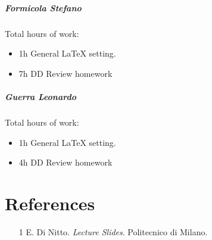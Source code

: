 \documentclass{report}
\newcommand{\ic}[1]{\textit{#1}}
\begin{document}
		\paragraph{Formicola Stefano} Total hours of work: 
			\begin{itemize}
				\item 1h General LaTeX setting.
				\item 7h DD Review homework
				
			\end{itemize}
		\paragraph{Guerra Leonardo} Total hours of work: 
			\begin{itemize}
				\item 1h General LaTeX setting.
				\item 4h DD Review homework
				
			\end{itemize}
	\chapter{References}
	\thispagestyle{fancy}
	\begin{itemize}
				\item[1]E. Di Nitto. \ic{Lecture Slides}. Politecnico di Milano.
	\end{itemize}
	
\end{document}

